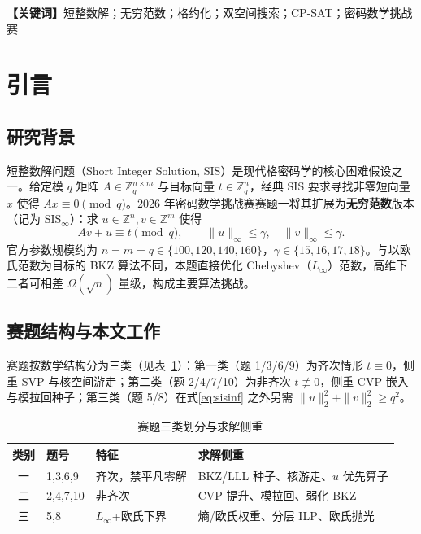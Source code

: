 \documentclass[12pt,a4paper]{ctexart}
\begin{document}
\vspace{0.8em}
\noindent\textbf{【关键词】}短整数解；无穷范数；格约化；双空间搜索；CP-SAT；密码数学挑战赛

\newpage
\tableofcontents
\newpage

\section{引言}

\subsection{研究背景}

短整数解问题（Short Integer Solution, SIS）是现代格密码学的核心困难假设之一。给定模 $q$ 矩阵 $A\in\mathbb{Z}_q^{n\times m}$ 与目标向量 $t\in\mathbb{Z}_q^n$，经典 SIS 要求寻找非零短向量 $x$ 使得 $Ax\equiv 0\pmod q$。2026 年密码数学挑战赛赛题一将其扩展为\textbf{无穷范数}版本（记为 SIS$_{\infty}$）：求 $u\in\mathbb{Z}^n,v\in\mathbb{Z}^m$ 使得
\begin{equation}
  Av + u \equiv t \pmod q,\qquad
  \|u\|_{\infty}\le\gamma,\quad \|v\|_{\infty}\le\gamma.
  \label{eq:sisinf}
\end{equation}
官方参数规模约为 $n=m=q\in\{100,120,140,160\}$，$\gamma\in\{15,16,17,18\}$。与以欧氏范数为目标的 BKZ 算法不同，本题直接优化 Chebyshev（$L_{\infty}$）范数，高维下二者可相差 $\Omega(\sqrt{n})$ 量级，构成主要算法挑战。

\subsection{赛题结构与本文工作}

赛题按数学结构分为三类（见表~\ref{tab:taxonomy}）：第一类（题 1/3/6/9）为齐次情形 $t\equiv 0$，侧重 SVP 与核空间游走；第二类（题 2/4/7/10）为非齐次 $t\not\equiv 0$，侧重 CVP 嵌入与模拉回种子；第三类（题 5/8）在式\eqref{eq:sisinf} 之外另需 $\|u\|_2^2+\|v\|_2^2\ge q^2$。

\begin{table}[htbp]
  \centering
  \caption{赛题三类划分与求解侧重}
  \label{tab:taxonomy}
  \begin{tabular}{clll}
    \toprule
    类别 & 题号 & 特征 & 求解侧重 \\
    \midrule
    一 & 1,3,6,9 & 齐次，禁平凡零解 & BKZ/LLL 种子、核游走、$u$ 优先算子 \\
    二 & 2,4,7,10 & 非齐次 & CVP 提升、模拉回、弱化 BKZ \\
    三 & 5,8 & $L_{\infty}$+欧氏下界 & 熵/欧氏权重、分层 ILP、欧氏抛光 \\
    \bottomrule
  \end{tabular}
\end{table}
\end{document}
